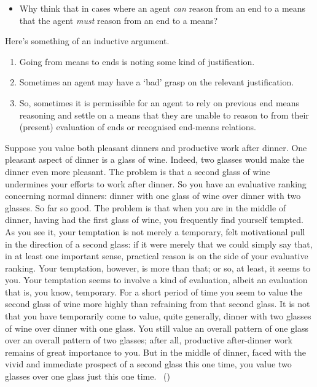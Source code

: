 \documentclass[10pt]{article}
\newcommand{\hand}{\ding{43}}
\newcommand{\hozlinedash}[0]{%
  \noindent\hdashrule[0.5ex][c]{\textwidth}{.1pt}{2.5pt}
}
\begin{document}
\begin{itemize}
\item[\hand] Why think that in cases where an agent \emph{can} reason from an end to a means that the agent \emph{must} reason from an end to a means?
\end{itemize}


Here's something of an inductive argument.

\begin{enumerate}
\item Going from means to ends is noting some kind of justification.
\item Sometimes an agent may have a `bad' grasp on the relevant justification.
\item So, sometimes it is permissible for an agent to rely on previous end means reasoning and settle on a means that they are unable to reason to from their (present) evaluation of ends or recognised end-means relations.
\end{enumerate}

\hozlinedash

\begin{scenario}[Wine]\label{sc:wine}
  Suppose you value both pleasant dinners and productive work after dinner.
  One pleasant aspect of dinner is a glass of wine.
  Indeed, two glasses would make the dinner even more pleasant.
  The problem is that a second glass of wine undermines your efforts to work after dinner.
  So you have an evaluative ranking concerning normal dinners: dinner with one glass of wine over dinner with two glasses.
  So far so good. The problem is that when you are in the middle of dinner, having had the first glass of wine, you frequently find yourself tempted.
  As you see it, your temptation is not merely a temporary, felt motivational pull in the direction of a second glass: if it were merely that we could simply say that, in at least one important sense, practical reason is on the side of your evaluative ranking.
  Your temptation, however, is more than that; or so, at least, it seems to you.
  Your temptation seems to involve a kind of evaluation, albeit an evaluation that is, you know, temporary.
  For a short period of time you seem to value the second glass of wine more highly than refraining from that second glass.
  It is not that you have temporarily come to value, quite generally, dinner with two glasses of wine over dinner with one glass.
  You still value an overall pattern of one glass over an overall pattern of two glasses; after all, productive after-dinner work remains of great importance to you.
  But in the middle of dinner, faced with the vivid and immediate prospect of a second glass this one time, you value two glasses over one glass just this one time.\nolinebreak
  \mbox{ }\hfill(\citeyear[257]{Bratman:2007ab})
\end{scenario}
\end{document}
